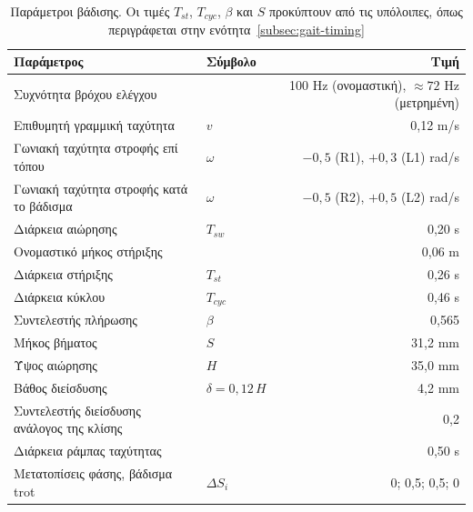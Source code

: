 \documentclass[11pt]{report}
\begin{document}
\begin{table}[htbp]
    \centering
    \small
    \begin{tabular}{@{}l l r@{}}
        \toprule
        Παράμετρος & Σύμβολο & Τιμή \\
        \midrule
        Συχνότητα βρόχου ελέγχου & & 100 Hz (ονομαστική), $\approx 72$ Hz (μετρημένη) \\
        Επιθυμητή γραμμική ταχύτητα & $v$ & 0,12 m/s \\
        Γωνιακή ταχύτητα στροφής επί τόπου & $\omega$ & $-0{,}5$ (R1), $+0{,}3$ (L1) rad/s \\
        Γωνιακή ταχύτητα στροφής κατά το βάδισμα & $\omega$ & $-0{,}5$ (R2), $+0{,}5$ (L2) rad/s \\
        Διάρκεια αιώρησης & $T_{sw}$ & 0,20 s \\
        Ονομαστικό μήκος στήριξης & & 0,06 m \\
        Διάρκεια στήριξης & $T_{st}$ & 0,26 s \\
        Διάρκεια κύκλου & $T_{cyc}$ & 0,46 s \\
        Συντελεστής πλήρωσης & $\beta$ & 0,565 \\
        Μήκος βήματος & $S$ & 31,2 mm \\
        Ύψος αιώρησης & $H$ & 35,0 mm \\
        Βάθος διείσδυσης & $\delta = 0{,}12\,H$ & 4,2 mm \\
        Συντελεστής διείσδυσης ανάλογος της κλίσης & & 0,2 \\
        Διάρκεια ράμπας ταχύτητας & & 0,50 s \\
        Μετατοπίσεις φάσης, βάδισμα trot & $\Delta S_i$ & 0; 0,5; 0,5; 0 \\
        \bottomrule
    \end{tabular}
    \caption[Παράμετροι βάδισης]{Παράμετροι βάδισης. Οι τιμές $T_{st}$,
    $T_{cyc}$, $\beta$ και $S$ προκύπτουν από τις υπόλοιπες, όπως περιγράφεται
    στην ενότητα~\ref{subsec:gait-timing}}
    \label{tab:appendix-gait-params}
\end{table}
\end{document}
